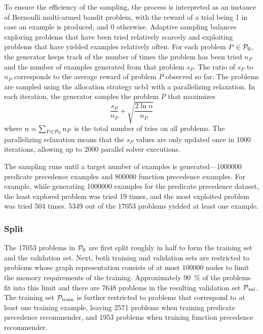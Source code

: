 To ensure the efficiency of the sampling, the process is interpreted as an instance of Bernoulli multi-armed bandit problem,
with the reward of a trial being 1 in case an example is produced, and 0 otherwise.
Adaptive sampling balances
exploring problems that have been tried relatively scarcely and
exploiting problems that have yielded examples relatively often.
For each problem $P \in \operatorname{\mathcal{P}_{0}}$,
the generator keeps track of the number of times the problem has been tried $n_P$
and the number of examples generated from that problem $s_P$.
The ratio of $s_P$ to $n_P$ corresponds to the average reward of problem $P$ observed so far.
The problems are sampled using the allocation strategy \acrshort{ucb1} \cite{Auer2002} with a parallelizing relaxation.
In each iteration, the generator samples the problem $P$ that maximizes
$$
\frac{s_P}{n_P} + \sqrt{\frac{2 \ln n}{n_P}}
$$
where $n = \sum_{P \in \operatorname{\mathcal{P}_{0}}} n_P$ is the total number of tries on all problems.
The parallelizing relaxation means that the $s_P$ values are only updated once in \num{1000} iterations,
allowing up to \num{2000} parallel solver executions.

The sampling runs until a target number of examples is generated---\num{1000000} predicate precedence examples and \num{800000} function precedence examples.
For example, while generating \num{1000000} examples for the predicate precedence dataset,
the least explored problem was tried 19 times, and the most exploited problem was tried 504 times.
\num{5349} out of the \num{17053} problems yielded at least one example.

\subsubsection{Split}

The \num{17053} problems in $\operatorname{\mathcal{P}_{0}}$ are first split roughly in half to form the training set and the validation set.
Next, both training and validation sets are restricted
to problems whose graph representation consists of at most \num{100000} nodes
to limit the memory requirements of the training.
Approximately \SI{90}{\percent} of the problems fit into this limit
and there are \num{7648} problems in the resulting validation set $\operatorname{\mathcal{P}_{\mathrm{val}}}$.
The training set $\operatorname{\mathcal{P}_{\mathrm{train}}}$ is further restricted to problems that correspond to at least one training example,
leaving \num{2571} problems when training predicate precedence recommender,
and \num{1953} problems when training function precedence recommender.

